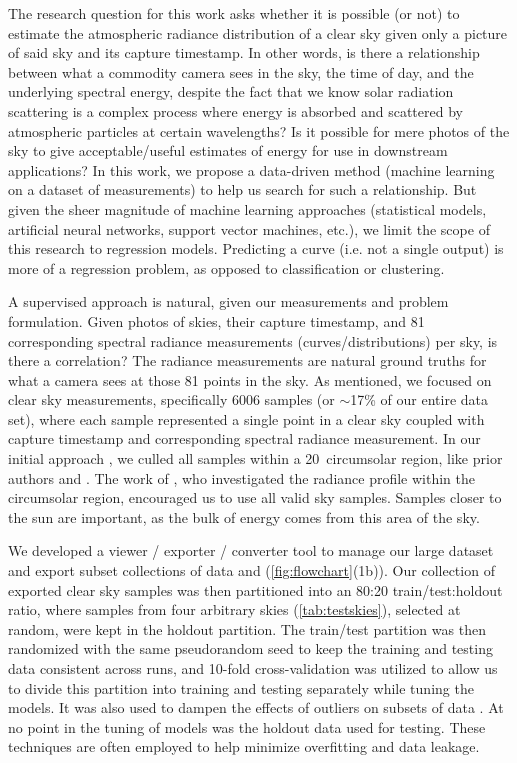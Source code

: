 The research question for this work asks whether it is possible (or not) to estimate the atmospheric radiance distribution of a clear sky given only a picture of said sky and its capture timestamp. In other words, is there a relationship between what a commodity camera sees in the sky, the time of day, and the underlying spectral energy, despite the fact that we know solar radiation scattering is a complex process where energy is absorbed and scattered by atmospheric particles at certain wavelengths? Is it possible for mere photos of the sky to give acceptable/useful estimates of energy for use in downstream applications? In this work, we propose a data-driven method (machine learning on a dataset of measurements) to help us search for such a relationship. But given the sheer magnitude of machine learning approaches (statistical models, artificial neural networks, support vector machines, etc.), we limit the scope of this research to regression models. Predicting a curve (i.e. not a single output) is more of a regression problem, as opposed to classification or clustering.

A supervised approach is natural, given our measurements and problem formulation. Given photos of skies, their capture timestamp, and 81 corresponding spectral radiance measurements (curves/distributions) per sky, is there a correlation? The radiance measurements are natural ground truths for what a camera sees at those 81 points in the sky. As mentioned, we focused on clear sky measurements, specifically 6006 samples (or $\mathtt{\sim}$17\% of our entire data set), where each sample represented a single point in a clear sky coupled with capture timestamp and corresponding spectral radiance measurement. In our initial approach \citep{delrocco_spie}, we culled all samples within a 20\degree~circumsolar region, like prior authors \citet{saito_estimation_2016} and \citet{tohsing_validation_2014}. The work of \cite{chauvin_modelling_2015}, who investigated the radiance profile within the circumsolar region, encouraged us to use all valid sky samples. Samples closer to the sun are important, as the bulk of energy comes from this area of the sky.

We developed a viewer / exporter / converter tool to manage our large dataset and export subset collections of data \citep{delrocco_spie} and (\autoref{fig:flowchart}(1b)). Our collection of exported clear sky samples was then partitioned into an 80:20 train/test:holdout ratio, where samples from four arbitrary skies (\autoref{tab:testskies}), selected at random, were kept in the holdout partition. The train/test partition was then randomized with the same pseudorandom seed to keep the training and testing data consistent across runs, and 10-fold cross-validation was utilized to allow us to divide this partition into training and testing separately while tuning the models. It was also used to dampen the effects of outliers on subsets of data \citep{picard_cv, kohavi_cvstudy}. At no point in the tuning of models was the holdout data used for testing. These techniques are often employed to help minimize overfitting and data leakage.

